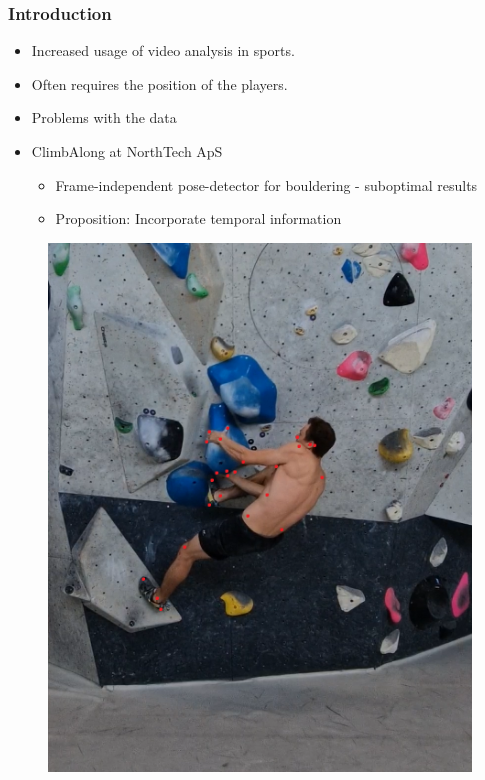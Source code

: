 \documentclass{beamer}
\begin{document}
\begin{frame}
    \frametitle{Introduction}
    \begin{minipage}{0.5\textwidth}
        \begin{itemize}
            \item<1-> Increased usage of video analysis in sports.
            \item<1-> Often requires the position of the players.
            \item<1-> Problems with the data
            \item<1-> ClimbAlong at NorthTech ApS
            \begin{itemize}
                \item<1-> Frame-independent pose-detector for bouldering - suboptimal results
                \item<2-> Proposition: Incorporate temporal information
            \end{itemize}
        \end{itemize}
    \end{minipage} \hfill
    \begin{minipage}{0.45\textwidth}
        \begin{figure}
            \center
            \includegraphics[width = \textwidth]{./entities/ClimbAlong_cv_2.PNG}
        \end{figure}
    \end{minipage}
\end{frame}
\end{document}
